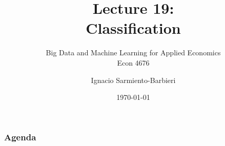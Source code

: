 \documentclass[
  shownotes,
  xcolor={svgnames},
  hyperref={colorlinks,citecolor=DarkBlue,linkcolor=DarkRed,urlcolor=DarkBlue}
  , aspectratio=169]{beamer}
\begin{document}
 
\title[Lecture 19]{Lecture 19: \\ Classification}
\subtitle{Big Data and Machine Learning for Applied Economics \\ Econ 4676}
\date{\today}

\author[Sarmiento-Barbieri]{Ignacio Sarmiento-Barbieri}


\begin{frame}[noframenumbering]
\maketitle
\end{frame}





\begin{frame}
\frametitle{Agenda}

\tableofcontents

\end{frame}

\end{document}

